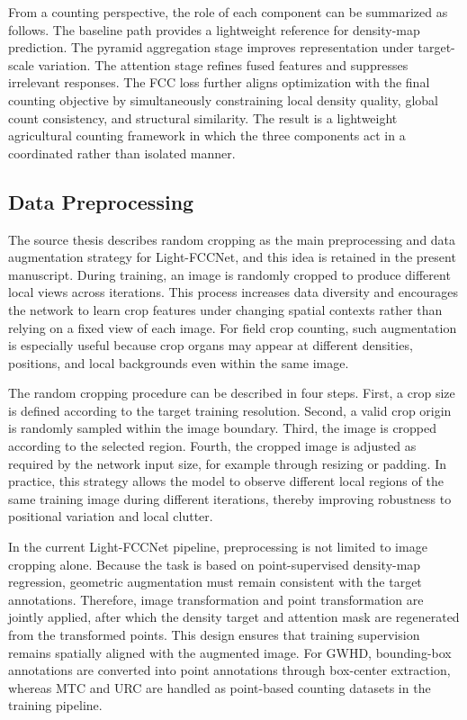 \documentclass[a4paper,fleqn]{cas-sc}
\begin{document}
From a counting perspective, the role of each component can be summarized as follows. The baseline path provides a lightweight reference for density-map prediction. The pyramid aggregation stage improves representation under target-scale variation. The attention stage refines fused features and suppresses irrelevant responses. The FCC loss further aligns optimization with the final counting objective by simultaneously constraining local density quality, global count consistency, and structural similarity. The result is a lightweight agricultural counting framework in which the three components act in a coordinated rather than isolated manner.

\subsection{Data Preprocessing}

The source thesis describes random cropping as the main preprocessing and data augmentation strategy for Light-FCCNet, and this idea is retained in the present manuscript. During training, an image is randomly cropped to produce different local views across iterations. This process increases data diversity and encourages the network to learn crop features under changing spatial contexts rather than relying on a fixed view of each image. For field crop counting, such augmentation is especially useful because crop organs may appear at different densities, positions, and local backgrounds even within the same image.

The random cropping procedure can be described in four steps. First, a crop size is defined according to the target training resolution. Second, a valid crop origin is randomly sampled within the image boundary. Third, the image is cropped according to the selected region. Fourth, the cropped image is adjusted as required by the network input size, for example through resizing or padding. In practice, this strategy allows the model to observe different local regions of the same training image during different iterations, thereby improving robustness to positional variation and local clutter.

In the current Light-FCCNet pipeline, preprocessing is not limited to image cropping alone. Because the task is based on point-supervised density-map regression, geometric augmentation must remain consistent with the target annotations. Therefore, image transformation and point transformation are jointly applied, after which the density target and attention mask are regenerated from the transformed points. This design ensures that training supervision remains spatially aligned with the augmented image. For GWHD, bounding-box annotations are converted into point annotations through box-center extraction, whereas MTC and URC are handled as point-based counting datasets in the training pipeline.
\end{document}
